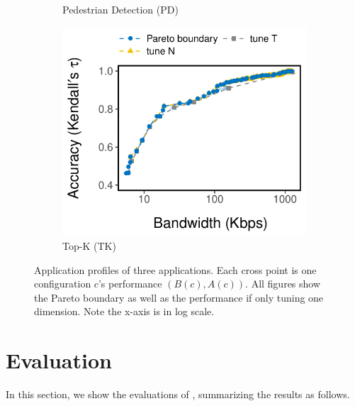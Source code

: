 \begin{figure}[htb]
\begin{subfigure}[t]{0.28\textwidth}
    \caption{Pedestrian Detection (PD)}
    \label{fig:pd-profile}
  \end{subfigure}
  \hfill
  \begin{subfigure}[t]{0.28\textwidth}
    \centering
    \includegraphics[width=\textwidth]{figures/profile-topk.pdf}
    \caption{Top-K (TK)}
    \label{fig:tk-profile}
  \end{subfigure}
  \caption{Application profiles of three applications. Each cross point is one
    configuration $c$'s performance $(B(c), A(c))$. All figures show the Pareto
    boundary as well as the performance if only tuning one dimension. Note the
    x-axis is in log scale.}
  \label{fig:all-profiles}
  \vspace{-1em}
\end{figure}

\section{Evaluation}
\label{sec:evaluation}

In this section, we show the evaluations of \sysname{}, summarizing the results
as follows.

